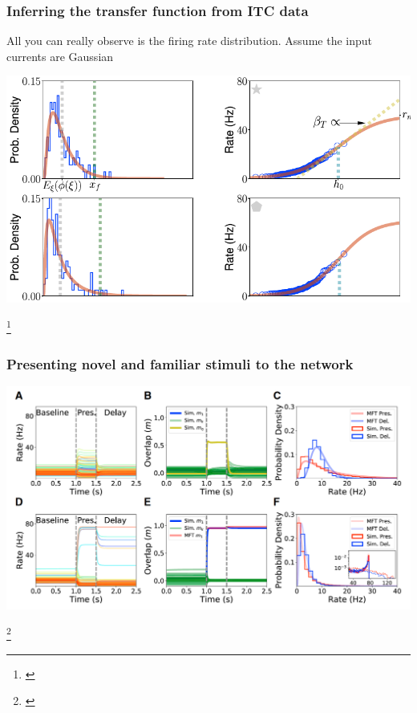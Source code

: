 \documentclass{beamer}
\begin{document}
\begin{frame}[plain]
\frametitle{Inferring the transfer function from ITC data}

\vspace{0.2in}
All you can really observe is the firing rate distribution. Assume the input currents are Gaussian 

\begin{center}
\includegraphics[scale=0.45]{transfer-function}
\end{center}

\footnote{\cite{peirera}}
\end{frame}

\begin{frame}[plain]
\frametitle{Presenting novel and familiar stimuli to the network}

\vspace{0.2in}

\begin{center}
\includegraphics[scale=0.4]{novel-familiar}
\end{center}

\footnote{\cite{peirera}}

\end{frame}
\end{document}
